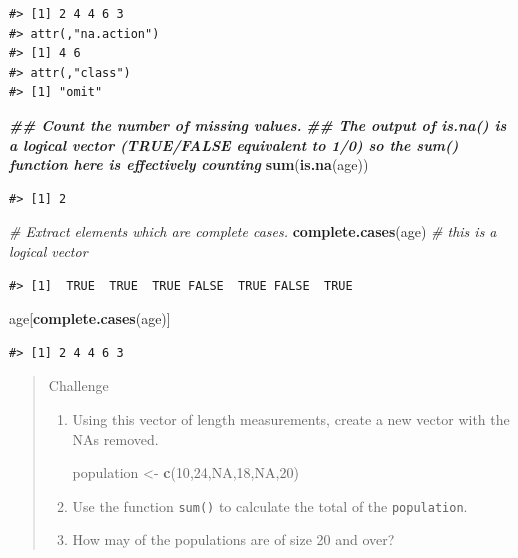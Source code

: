 \documentclass[
]{book}
\newenvironment{Shaded}{\begin{snugshade}}{\end{snugshade}}
\newcommand{\CommentTok}[1]{\textcolor[rgb]{0.56,0.35,0.01}{\textit{#1}}}
\newcommand{\ConstantTok}[1]{\textcolor[rgb]{0.56,0.35,0.01}{#1}}
\newcommand{\DecValTok}[1]{\textcolor[rgb]{0.00,0.00,0.81}{#1}}
\newcommand{\DocumentationTok}[1]{\textcolor[rgb]{0.56,0.35,0.01}{\textbf{\textit{#1}}}}
\newcommand{\FunctionTok}[1]{\textcolor[rgb]{0.13,0.29,0.53}{\textbf{#1}}}
\newcommand{\NormalTok}[1]{#1}
\newcommand{\OtherTok}[1]{\textcolor[rgb]{0.56,0.35,0.01}{#1}}
\begin{document}
\begin{verbatim}
#> [1] 2 4 4 6 3
#> attr(,"na.action")
#> [1] 4 6
#> attr(,"class")
#> [1] "omit"
\end{verbatim}

\begin{Shaded}
\begin{Highlighting}[]
\DocumentationTok{\#\# Count the number of missing values.}
\DocumentationTok{\#\# The output of is.na() is a logical vector (TRUE/FALSE equivalent to 1/0) so the sum() function here is effectively counting}
\FunctionTok{sum}\NormalTok{(}\FunctionTok{is.na}\NormalTok{(age))}
\end{Highlighting}
\end{Shaded}

\begin{verbatim}
#> [1] 2
\end{verbatim}

\begin{Shaded}
\begin{Highlighting}[]
\CommentTok{\# Extract elements which are complete cases.}
\FunctionTok{complete.cases}\NormalTok{(age) }\CommentTok{\# this is a logical vector}
\end{Highlighting}
\end{Shaded}

\begin{verbatim}
#> [1]  TRUE  TRUE  TRUE FALSE  TRUE FALSE  TRUE
\end{verbatim}

\begin{Shaded}
\begin{Highlighting}[]
\NormalTok{age[}\FunctionTok{complete.cases}\NormalTok{(age)]}
\end{Highlighting}
\end{Shaded}

\begin{verbatim}
#> [1] 2 4 4 6 3
\end{verbatim}

\begin{quote}
Challenge

\begin{enumerate}
\def\labelenumi{\arabic{enumi}.}
\item
  Using this vector of length measurements, create a new vector with the NAs
  removed.

\begin{Shaded}
\begin{Highlighting}[]
\NormalTok{population }\OtherTok{\textless{}{-}} \FunctionTok{c}\NormalTok{(}\DecValTok{10}\NormalTok{,}\DecValTok{24}\NormalTok{,}\ConstantTok{NA}\NormalTok{,}\DecValTok{18}\NormalTok{,}\ConstantTok{NA}\NormalTok{,}\DecValTok{20}\NormalTok{)}
\end{Highlighting}
\end{Shaded}
\item
  Use the function \texttt{sum()} to calculate the total of the \texttt{population}.
\item
  How may of the populations are of size 20 and over?
\end{enumerate}
\end{quote}
\end{document}
